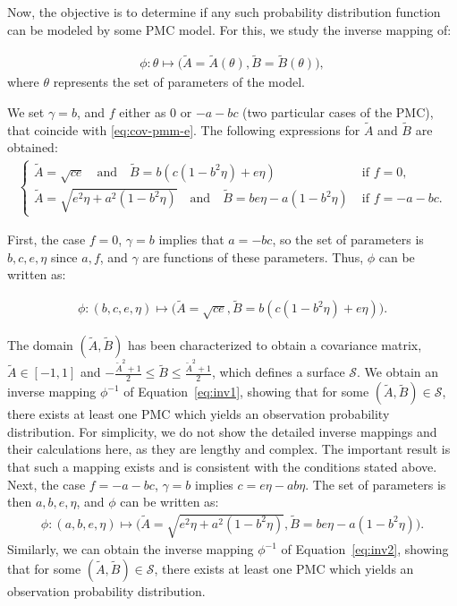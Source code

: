 \vspace{0.65cm}  
Now, the objective is to determine if any such probability distribution function can be modeled by some PMC model. For this, we study the inverse mapping of:

\begin{align}
  \label{eq:phige}
      \phi : \theta \mapsto \big(\tilde{A} = \tilde{A}(\theta), \tilde{B} = \tilde{B}(\theta)\big),
\end{align}
where $\theta$ represents the set of parameters of the model.

We set $\gamma = b$, and \(f\) either as \(0\) or \(-a - bc\) (two particular
cases of the PMC), that coincide with \eqref{eq:cov-pmm-e}. 
The following expressions for \(\tilde{A}\) and \(\tilde{B}\) are obtained:
\begin{eqnarray*}
    \left\{
    \begin{matrix}
    \tilde{A} = \sqrt{ce} \quad \text{and} \quad \tilde{B} = b(c(1 - b^2\eta) + e\eta)  & \;  \text{if } f = 0, \\ 
    \tilde{A} = \sqrt{e^2\eta + a^2(1 - b^2\eta)} \quad \text{and} \quad \tilde{B} = be\eta - a(1 - b^2\eta) & \; \text{if } f = -a - bc.
    \end{matrix} \right.
\end{eqnarray*}

First, the case \(f = 0\), \(\gamma = b\) implies that \(a = -bc\), so the set of parameters is \(b, c, e, \eta\) since \(a, f\), and \(\gamma\) are functions of these parameters. Thus, \(\phi\) can be written as:

\begin{align}
\label{eq:inv1}
    \phi :(b, c, e, \eta) \mapsto \big(\tilde{A} = \sqrt{ce}, \tilde{B} = b(c(1 - b^2 \eta) + e \eta) \big).
\end{align}

The domain \((\tilde{A}, \tilde{B})\) has been characterized to obtain a
covariance matrix, \ie~\(\tilde{A} \in [-1, 1]\) and \(-\frac{\tilde{A}^2 +
1}{2} \leq \tilde{B} \leq \frac{\tilde{A}^2 + 1}{2}\), which  defines a surface
\(\mathcal{S}\). We obtain an inverse mapping
\(\phi^{-1}\) of Equation~\eqref{eq:inv1}, showing that for some \((\tilde{A},
\tilde{B}) \in \mathcal{S}\), there exists at least one PMC which yields an
observation probability distribution.
For simplicity, we do not show the detailed inverse mappings and their
calculations here, as they are lengthy and complex. The important result is that
such a mapping exists and is consistent with the conditions stated above.\\

Next, the case \(f = -a - bc\), \(\gamma = b\)  implies \(c = e\eta - ab\eta\). The set of parameters is then \(a, b, e, \eta\), and \(\phi\) can be written as:
\begin{align}
\label{eq:inv2}
    \phi :(a, b, e, \eta) \mapsto \big(\tilde{A} = \sqrt{e^2 \eta + a^2 (1 - b^2 \eta)}, \tilde{B} = be \eta - a (1 - b^2 \eta) \big).
\end{align}
Similarly, we can obtain the inverse mapping \(\phi^{-1}\) of Equation~\eqref{eq:inv2}, showing that for some \((\tilde{A}, \tilde{B}) \in \mathcal{S}\), there exists at least one PMC which yields an observation probability distribution.

